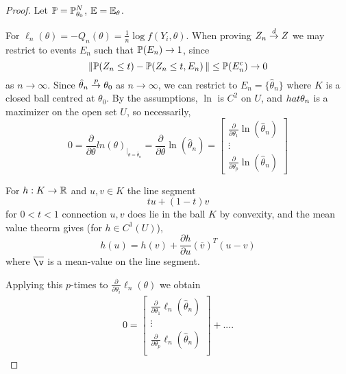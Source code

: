 \begin{proof}
  Let $\Prob = \Prob_{\theta_{0}}^{N}$, $\E = \mathbb{E}_{\theta}$.

  For $\ell_{n}(\theta) = -Q_{n}(\theta) = \frac{1}{n} \log f(Y_{i},
  \theta)$.  When proving $Z_{n} \overset{d}{\rightarrow} Z$ we may restrict to events
  $E_{n}$ such that $\Prob{E_{n}} \rightarrow 1$, since
  \begin{equation}
    \label{eq:61}
    \| \Prob{Z_{n} \leq t}- \Prob{Z_{n} \leq t, E_{n}} \| \leq
    \Prob{E_{n}^{c}} \rightarrow 0
  \end{equation} as $n \rightarrow \infty$.  Since $\hat \theta_{n}
  \overset{p}{\rightarrow} \theta_{0}$ as $n \rightarrow \infty$, we can restrict to $E_{n}
  = \{ \hat \theta_{n} \}$ where $K$ is a closed ball centred at
  $\theta_{0}$.  By the assumptions, $\ln$ is $C^{2}$ on $U$, and
  $\\hat \theta_{n}$ is a maximizer on the open set $U$, so necessarily,
  \begin{equation}
    \label{eq:62}
    0 = \frac{\partial}{\partial \theta} ln(\theta)_{|_{\theta = \hat \theta_{n}}} =
    \frac{\partial}{\partial \theta} \ln (\hat \theta_{n}) =
    \begin{bmatrix}
      \frac{\partial}{\partial \theta_{1}} \ln (\hat \theta_{n}) \\
      \vdots \\
      \frac{\partial}{\partial \theta_{p}} \ln (\hat \theta_{n})
    \end{bmatrix}
  \end{equation}

  For $h: K \rightarrow \mathbb{R}$ and $u, v \in K$ the line segment
  \begin{equation}
    \label{eq:63}
    tu + (1-t)v
  \end{equation} for $0 < t < 1$ connection $u, v$ does lie in the
  ball $K$ by convexity, and the mean value theorm gives (for $h \in
  C^{1}(U)$),
  \begin{equation}
    \label{eq:64}
    h(u) = h(v) + \frac{\partial h}{\partial u} (\overline v)^{T} (u-v)
  \end{equation} where $\overline \v$ is a mean-value on the line
  segment.

  Applying this $p$-times to $\frac{\partial}{\partial \theta_{i}}
  \ell_{n}(\theta)$ we obtain
  \begin{align}
    \label{eq:65}
    0 =
    \begin{bmatrix}
      \frac{\partial}{\partial \theta_{1}} \ell_{n}(\hat \theta_{n})  \\
      \vdots \\
      \frac{\partial}{\partial \theta_{p}} \ell_{n}(\hat \theta_{n})  \\
    \end{bmatrix} + ....
    

\end{align}
\end{proof}

